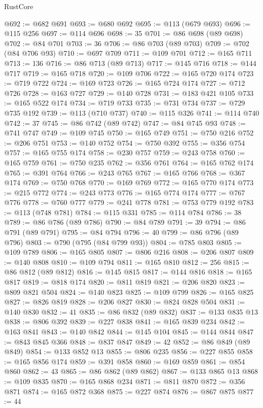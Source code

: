 \begin{lexlean}{RustCore}
\begin{coremodule}
@692 := @682 @691
@693 := @680 @692
@695 := @113 (@679 @693)
@696 := @115 @256
@697 := @114 @696
@698 := 35
@701 := @86 @698 (@89 @698)
@702 := @84 @701
@703 := 36
@706 := @86 @703 (@89 @703)
@709 := @702 (@84 @706 @93)
@710 := @697 @709
@711 := @109 @701
@712 := @165 @711
@713 := 136
@716 := @86 @713 (@89 @713)
@717 := @145 @716
@718 := @144 @717
@719 := @165 @718
@720 := @109 @706
@722 := @165 @720 @174
@723 := @719 @722
@724 := @169 @723
@726 := @165 @724 @174
@727 := @712 @726
@728 := @163 @727
@729 := @140 @728
@731 := @183 @421 @105
@733 := @165 @522 @174
@734 := @719 @733
@735 := @731 @734
@737 := @729 @735 @192
@739 := @113 (@710 @737)
@740 := @115 @326
@741 := @114 @740
@742 := 37
@745 := @86 @742 (@89 @742)
@747 := @84 @745 @93
@748 := @741 @747
@749 := @109 @745
@750 := @165 @749
@751 := @750 @216
@752 := @206 @751
@753 := @140 @752
@754 := @750 @392
@755 := @356 @754
@757 := @165 @755 @174
@758 := @230 @757
@759 := @243 @758
@760 := @165 @759
@761 := @750 @235
@762 := @356 @761
@764 := @165 @762 @174
@765 := @391 @764
@766 := @243 @765
@767 := @165 @766
@768 := @367 @174
@769 := @750 @768
@770 := @169 @769
@772 := @165 @770 @174
@773 := @215 @772
@774 := @243 @773
@776 := @165 @774 @174
@777 := @767 @776
@778 := @760 @777
@779 := @241 @778
@781 := @753 @779 @192
@783 := @113 (@748 @781)
@784 := @115 @331
@785 := @114 @784
@786 := 38
@789 := @86 @786 (@89 @786)
@790 := @84 @789
@791 := 39
@794 := @86 @791 (@89 @791)
@795 := @84 @794
@796 := 40
@799 := @86 @796 (@89 @796)
@803 := @790 (@795 (@84 @799 @93))
@804 := @785 @803
@805 := @109 @789
@806 := @165 @805
@807 := @806 @216
@808 := @206 @807
@809 := @140 @808
@810 := @109 @794
@811 := @165 @810
@812 := 256
@815 := @86 @812 (@89 @812)
@816 := @145 @815
@817 := @144 @816
@818 := @165 @817
@819 := @818 @174
@820 := @811 @819
@821 := @206 @820
@823 := @809 @821 @504
@824 := @140 @823
@825 := @109 @799
@826 := @165 @825
@827 := @826 @819
@828 := @206 @827
@830 := @824 @828 @504
@831 := @140 @830
@832 := 41
@835 := @86 @832 (@89 @832)
@837 := @133 @835 @13
@838 := @806 @392
@839 := @227 @838
@841 := @165 @839 @234
@842 := @163 @841
@843 := @140 @842
@844 := @145 @104
@845 := @144 @844
@847 := @843 @845 @366
@848 := @837 @847
@849 := 42
@852 := @86 @849 (@89 @849)
@854 := @133 @852 @13
@855 := @806 @235
@856 := @227 @855
@858 := @165 @856 @174
@859 := @391 @858
@860 := @169 @859
@861 := @854 @860
@862 := 43
@865 := @86 @862 (@89 @862)
@867 := @133 @865 @13
@868 := @109 @835
@870 := @165 @868 @234
@871 := @811 @870
@872 := @356 @871
@874 := @165 @872 @368
@875 := @227 @874
@876 := @867 @875
@877 := 44

\end{coremodule}
\end{lexlean}
